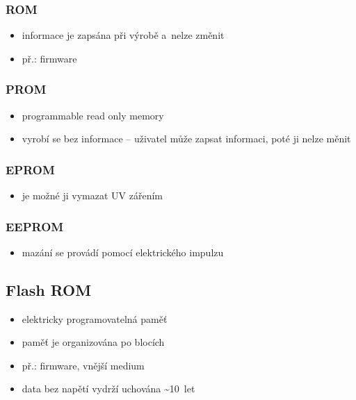 \documentclass[a4paper,12pt]{article}
\providecommand{\tightlist}{%
\setlength{\itemsep}{0pt}\setlength{\parskip}{0pt}}
\begin{document}
\subsubsection{ROM}

\begin{itemize}
\tightlist
\item informace je zapsána při výrobě a~nelze změnit
\item př.: firmware
\end{itemize}

\subsubsection{PROM}

\begin{itemize}
\tightlist
\item programmable read only memory
\item vyrobí se bez informace -- uživatel může zapsat informaci, poté ji
  nelze měnit
\end{itemize}

\subsubsection{EPROM}

\begin{itemize}
\tightlist
\item je možné ji vymazat UV zářením
\end{itemize}

\subsubsection{EEPROM}

\begin{itemize}
\tightlist
\item mazání se provádí pomocí elektrického impulzu
\end{itemize}

\subsection{Flash ROM}

\begin{itemize}
\tightlist
\item elektricky programovatelná paměť
\item paměť je organizována po blocích
\item př.: firmware, vnější medium
\item data bez napětí vydrží uchována \textasciitilde{}10~let
\end{itemize}
\end{document}

